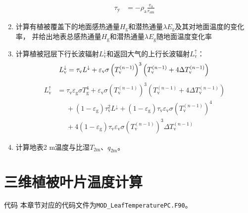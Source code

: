 \begin{enumerate}
\begin{equation}
\begin{aligned}
        \tau_{\mathrm{y}} & =- \rho_{\mathrm{a}} \frac{v_{\mathrm{a}}}{r_{\mathrm{am}}}
      \end{aligned}
    \end{equation}
  \item 计算有植被覆盖下的地面感热通量$H_{\mathrm{g}}$和潜热通量$\lambda E_{\mathrm{g}}$及其对地面温度的变化率，
    并给出地表总感热通量$H_{\mathrm {g}} $和潜热通量$\lambda E_{\mathrm {g}} $随地面温度变化率
  \item 计算植被冠层下行长波辐射$L_{\mathrm{v}}^\downarrow$和返回大气的上行长波辐射$L_{\mathrm v} ^\uparrow$：
    \begin{equation}
      L_{\mathrm{v}} ^\downarrow =  \tau_{\mathrm{v}} L ^\downarrow+\varepsilon_{\mathrm{v}}\sigma \left (T_{\mathrm{v}}^{(n - 1)}\right)^3\left( T_{\mathrm{v}}^{(n - 1)} + 4\Delta T_{\mathrm{v}}^{(n - 1)} \right)\\
    \end{equation}
    \begin{equation}
      \begin{aligned}
        L_{\mathrm{v}}^ \uparrow &=  \tau_{\mathrm{v}} \varepsilon_{\mathrm{g}} \sigma T_{\mathrm{g}}^{4}+ \varepsilon_{\mathrm{v}}\sigma \left ( T_{\mathrm{v}}^{(n - 1)}\right )^3\left( T_{\mathrm{v}}^{(n - 1)} + 4\Delta T_{\mathrm{v}}^{(n - 1)} \right) \\[1ex]
        &\mathrel{\phantom{=}} + \left ( 1- \varepsilon_{\mathrm{g}} \right)\tau_{\mathrm{v}}^2 L ^\downarrow + \left ( 1- \varepsilon_{\mathrm{g}} \right) \tau_{\mathrm{v}} \varepsilon_{\mathrm{v}} \sigma \left (T_{\mathrm{v}}^{(n - 1)}\right) ^4 \\[1ex]
        &\mathrel{\phantom{=}} + 4 \left ( 1- \varepsilon_{\mathrm{g}} \right) \tau_{\mathrm{v}} \varepsilon_{\mathrm{v}} \sigma \left (T_{\mathrm{v}}^{(n - 1)}\right)^3 \Delta T_{\mathrm{v}}^{(n - 1)}
      \end{aligned}
    \end{equation}
  \item 计算地表2 m温度与比湿$T_{\mathrm{2m}}$、$q_{\mathrm{2m}}$。
\end{enumerate}

\section{三维植被叶片温度计算}

\begin{mymdframed}{代码}
  本章节对应的代码文件为\texttt{MOD\_LeafTemperaturePC.F90}。
\end{mymdframed}

